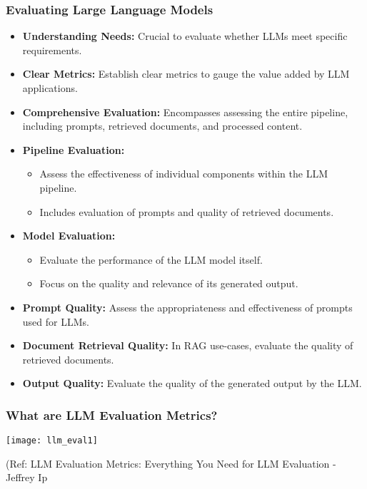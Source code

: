 \begin{frame}[fragile]\frametitle{Evaluating Large Language Models}
  \begin{itemize}
    \item \textbf{Understanding Needs:} Crucial to evaluate whether LLMs meet specific requirements.
    \item \textbf{Clear Metrics:} Establish clear metrics to gauge the value added by LLM applications.
    \item \textbf{Comprehensive Evaluation:} Encompasses assessing the entire pipeline, including prompts, retrieved documents, and processed content.
    \item \textbf{Pipeline Evaluation:}
      \begin{itemize}
        \item Assess the effectiveness of individual components within the LLM pipeline.
        \item Includes evaluation of prompts and quality of retrieved documents.
      \end{itemize}
    \item \textbf{Model Evaluation:}
      \begin{itemize}
        \item Evaluate the performance of the LLM model itself.
        \item Focus on the quality and relevance of its generated output.
      \end{itemize}
    \item \textbf{Prompt Quality:} Assess the appropriateness and effectiveness of prompts used for LLMs.
    \item \textbf{Document Retrieval Quality:} In RAG use-cases, evaluate the quality of retrieved documents.
    \item \textbf{Output Quality:} Evaluate the quality of the generated output by the LLM.
  \end{itemize}
\end{frame}

\begin{frame}[fragile]\frametitle{What are LLM Evaluation Metrics?}


\begin{center}
\texttt{[image: llm\_eval1]}
\end{center}		
		
{\tiny (Ref: LLM Evaluation Metrics: Everything You Need for LLM Evaluation - Jeffrey Ip}
			
			
\end{frame}

